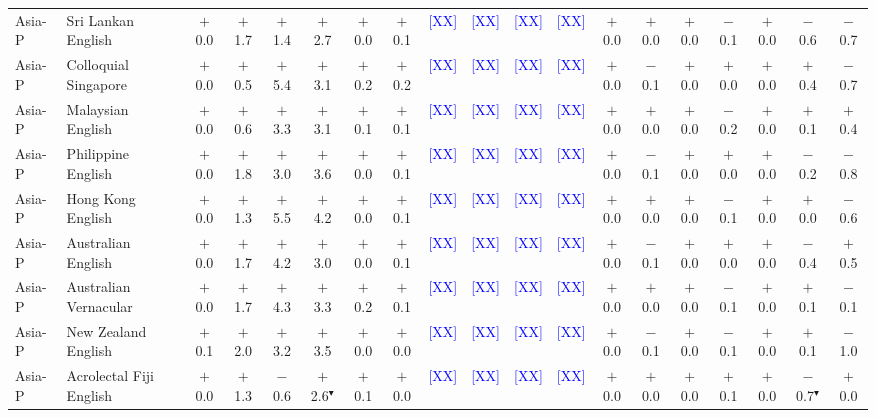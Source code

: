 \begin{table}[t]
\begin{tabular}{llccccccccccccccccc}
Asia-P & Sri Lankan English & $+$0.0 & $+$1.7 & $+$1.4 & $+$2.7 & $+$0.0 & $+$0.1 & \textcolor{blue}{[XX]} & \textcolor{blue}{[XX]} & \textcolor{blue}{[XX]} & \textcolor{blue}{[XX]} & $+$0.0 & $+$0.0 & $+$0.0 & $-$0.1 & $+$0.0 & $-$0.6 & $-$0.7 \\
Asia-P & Colloquial Singapore & $+$0.0 & $+$0.5 & $+$5.4 & $+$3.1 & $+$0.2 & $+$0.2 & \textcolor{blue}{[XX]} & \textcolor{blue}{[XX]} & \textcolor{blue}{[XX]} & \textcolor{blue}{[XX]} & $+$0.0 & $-$0.1 & $+$0.0 & $+$0.0 & $+$0.0 & $+$0.4 & $-$0.7 \\
Asia-P & Malaysian English & $+$0.0 & $+$0.6 & $+$3.3 & $+$3.1 & $+$0.1 & $+$0.1 & \textcolor{blue}{[XX]} & \textcolor{blue}{[XX]} & \textcolor{blue}{[XX]} & \textcolor{blue}{[XX]} & $+$0.0 & $+$0.0 & $+$0.0 & $-$0.2 & $+$0.0 & $+$0.1 & $+$0.4 \\
Asia-P & Philippine English & $+$0.0 & $+$1.8 & $+$3.0 & $+$3.6 & $+$0.0 & $+$0.1 & \textcolor{blue}{[XX]} & \textcolor{blue}{[XX]} & \textcolor{blue}{[XX]} & \textcolor{blue}{[XX]} & $+$0.0 & $-$0.1 & $+$0.0 & $+$0.0 & $+$0.0 & $-$0.2 & $-$0.8 \\
Asia-P & Hong Kong English & $+$0.0 & $+$1.3 & $+$5.5 & $+$4.2 & $+$0.0 & $+$0.1 & \textcolor{blue}{[XX]} & \textcolor{blue}{[XX]} & \textcolor{blue}{[XX]} & \textcolor{blue}{[XX]} & $+$0.0 & $+$0.0 & $+$0.0 & $-$0.1 & $+$0.0 & $+$0.0 & $-$0.6 \\
Asia-P & Australian English & $+$0.0 & $+$1.7 & $+$4.2 & $+$3.0 & $+$0.0 & $+$0.1 & \textcolor{blue}{[XX]} & \textcolor{blue}{[XX]} & \textcolor{blue}{[XX]} & \textcolor{blue}{[XX]} & $+$0.0 & $-$0.1 & $+$0.0 & $+$0.0 & $+$0.0 & $-$0.4 & $+$0.5 \\
Asia-P & Australian Vernacular & $+$0.0 & $+$1.7 & $+$4.3 & $+$3.3 & $+$0.2 & $+$0.1 & \textcolor{blue}{[XX]} & \textcolor{blue}{[XX]} & \textcolor{blue}{[XX]} & \textcolor{blue}{[XX]} & $+$0.0 & $+$0.0 & $+$0.0 & $-$0.1 & $+$0.0 & $+$0.1 & $-$0.1 \\
Asia-P & New Zealand English & $+$0.1 & $+$2.0 & $+$3.2 & $+$3.5 & $+$0.0 & $+$0.0 & \textcolor{blue}{[XX]} & \textcolor{blue}{[XX]} & \textcolor{blue}{[XX]} & \textcolor{blue}{[XX]} & $+$0.0 & $-$0.1 & $+$0.0 & $-$0.1 & $+$0.0 & $+$0.1 & $-$1.0 \\
Asia-P & Acrolectal Fiji English & $+$0.0 & $+$1.3 & $-$0.6 & $+$2.6$^\blacktriangledown$ & $+$0.1 & $+$0.0 & \textcolor{blue}{[XX]} & \textcolor{blue}{[XX]} & \textcolor{blue}{[XX]} & \textcolor{blue}{[XX]} & $+$0.0 & $+$0.0 & $+$0.0 & $+$0.1 & $+$0.0 & $-$0.7$^\blacktriangledown$ & $+$0.0 \\

\end{tabular}
\end{table}

